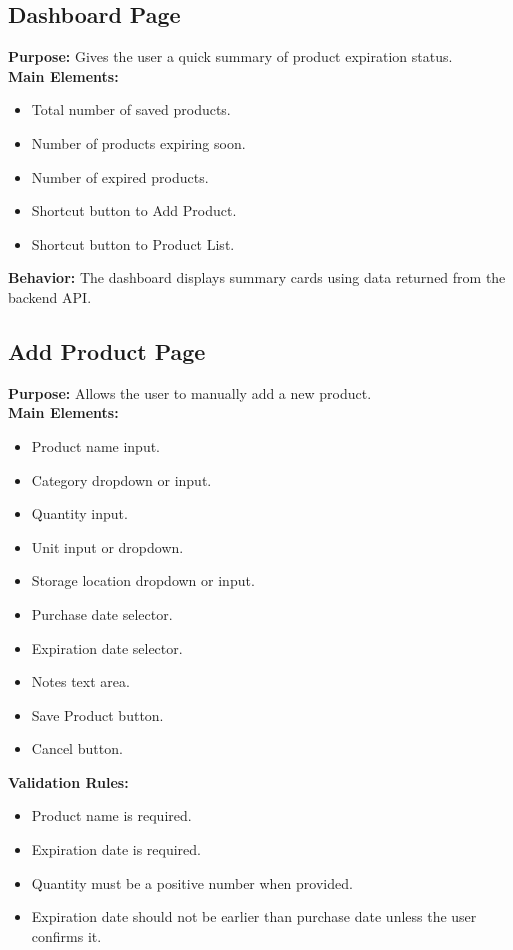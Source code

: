 \documentclass[12pt]{article}
\begin{document}
\subsection{Dashboard Page}
\textbf{Purpose:} Gives the user a quick summary of product expiration status.\\
\textbf{Main Elements:}
\begin{itemize}[leftmargin=*]
    \item Total number of saved products.
    \item Number of products expiring soon.
    \item Number of expired products.
    \item Shortcut button to Add Product.
    \item Shortcut button to Product List.
\end{itemize}
\textbf{Behavior:} The dashboard displays summary cards using data returned from the backend API.

\subsection{Add Product Page}
\textbf{Purpose:} Allows the user to manually add a new product.\\
\textbf{Main Elements:}
\begin{itemize}[leftmargin=*]
    \item Product name input.
    \item Category dropdown or input.
    \item Quantity input.
    \item Unit input or dropdown.
    \item Storage location dropdown or input.
    \item Purchase date selector.
    \item Expiration date selector.
    \item Notes text area.
    \item Save Product button.
    \item Cancel button.
\end{itemize}
\textbf{Validation Rules:}
\begin{itemize}[leftmargin=*]
    \item Product name is required.
    \item Expiration date is required.
    \item Quantity must be a positive number when provided.
    \item Expiration date should not be earlier than purchase date unless the user confirms it.
\end{itemize}
\end{document}
